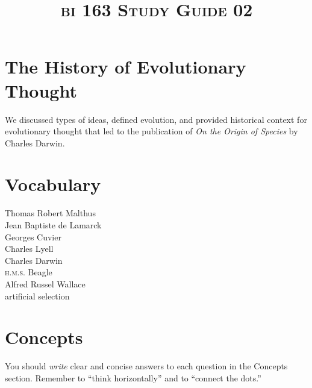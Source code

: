 \documentclass[letterpaper]{tufte-handout}
\title{\scshape{bi} 163 Study Guide 02}
\date{} %
\begin{document}
\maketitle	%

\section*{The History of Evolutionary Thought}

We discussed types of ideas, defined evolution, and provided historical context for evolutionary thought that led to the publication of \textit{On the Origin of Species} by Charles Darwin.

\section*{Vocabulary}

\vspace{-1\baselineskip}
\begin{multicols}{2}
Thomas Robert Malthus\\
Jean Baptiste de Lamarck \\
Georges Cuvier \\
Charles Lyell \\
Charles Darwin \\
\textsc{h.m.s.} Beagle \\
Alfred Russel Wallace \\
artificial selection 
\end{multicols}

\section*{Concepts}

You should \emph{write} clear and concise answers to each question in the Concepts section.  Remember to ``think horizontally'' and to ``connect the dots.'' 
\end{document}
